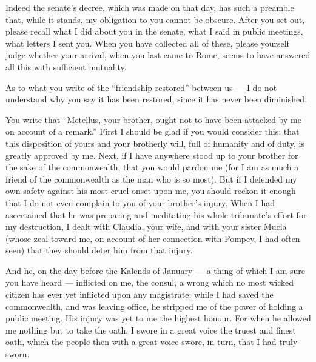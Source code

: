  Indeed the senate's decree, which was made on that day, has such a preamble that, while it stands, my obligation to you cannot be obscure. After you set out, please recall what I did about you in the senate, what I said in public meetings, what letters I sent you. When you have collected all of these, please yourself judge whether your arrival, when you last came to Rome, seems to have answered all this with sufficient mutuality.

 As to what you write of the ``friendship restored'' between us --- I do not understand why you say it has been restored, since it has never been diminished.

 You write that ``Metellus, your brother, ought not to have been attacked by me on account of a remark.'' First I should be glad if you would consider this: that this disposition of yours and your brotherly will, full of humanity and of duty, is greatly approved by me. Next, if I have anywhere stood up to your brother for the sake of the commonwealth, that you would pardon me (for I am as much a friend of the commonwealth as the man who is so most). But if I defended my own safety against his most cruel onset upon me, you should reckon it enough that I do not even complain to you of your brother's injury. When I had ascertained that he was preparing and meditating his whole tribunate's effort for my destruction, I dealt with Claudia, your wife, and with your sister Mucia (whose zeal toward me, on account of her connection with Pompey, I had often seen) that they should deter him from that injury.

 And he, on the day before the Kalends of January --- a thing of which I am sure you have heard --- inflicted on me, the consul, a wrong which no most wicked citizen has ever yet inflicted upon any magistrate; while I had saved the commonwealth, and was leaving office, he stripped me of the power of holding a public meeting. His injury was yet to me the highest honour. For when he allowed me nothing but to take the oath, I swore in a great voice the truest and finest oath, which the people then with a great voice swore, in turn, that I had truly sworn.

